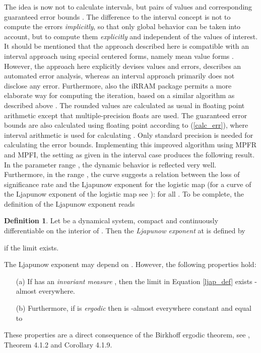 \documentclass[copyright,creativecommons]{eptcs}
\theoremstyle{definition}
\newtheorem{definition}{Definition}[section]
\begin{document}
The idea is now not to calculate intervals, but pairs of values 
and corresponding guaranteed error bounds . The difference to
the interval concept is not to compute the errors {\em implicitly},
so that only global behavior can be taken into account, but to compute
them {\em explicitly} and independent of the values of interest. It should be
mentioned that the approach described here is compatible with an interval
approach using special centered forms, namely mean value forms \cite{rr84}.
However, the approach here explicitly devises values and errors, describes
an automated error analysis, whereas an interval approach primarily does not
disclose any error. Furthermore, also the iRRAM package permits a more
elaborate way for computing the iteration, based on a similar algorithm as
described above \cite{mu10}. The rounded
values  are calculated as usual in floating point arithmetic except
that multiple-precision floats are used. The guaranteed error bounds are also
calculated using floating point according to (\ref{calc_err}), where
interval arithmetic is used for calculating . Only standard
precision is needed for calculating the error bounds.
Implementing this improved
algorithm using MPFR and MPFI, the setting as given in the interval case
produces the following result. 
In the parameter range , the dynamic behavior is reflected very
well. Furthermore, in the range , the curve suggests
a relation between the loss of significance rate and the Ljapunow
exponent  for the logistic map (for a curve of the Ljapunow
exponent of the logistic map see \cite{ce80}):
 for all . To be
complete, the definition of the Ljapunow exponent reads
\begin{definition}
\label{def:ljap}
Let  be a dynamical system,  compact and 
continuously differentiable on the interior of . Then the
{\em Ljapunow exponent} at  is defined by

if the limit exists.
\end{definition}
The Ljapunow exponent may depend on . However, the following
properties hold:
\begin{itemize}
\item[(a)]
If  has an {\em invariant measure} , then the limit in
Equation \ref{ljap_def} exists -almost everywhere.
\item[(b)]
Furthermore, if  is {\em ergodic} then 
is -almost everywhere constant and equal to

\end{itemize}
These properties are a direct consequence of the Birkhoff ergodic theorem,
see \cite{kh95}, Theorem 4.1.2 and Corollary 4.1.9.
\end{document}
